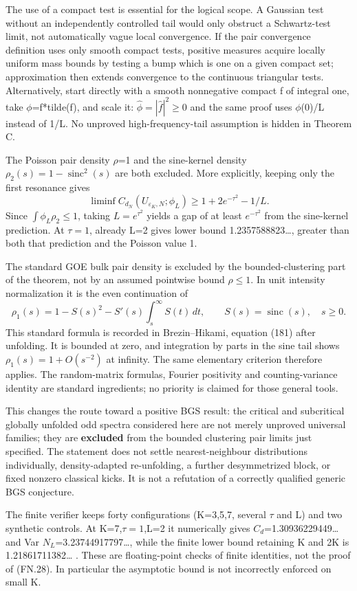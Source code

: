The use of a compact test is essential for the logical scope. A Gaussian test without an independently controlled tail would only obstruct a Schwartz-test limit, not automatically vague local convergence. If the pair convergence definition uses only smooth compact tests, positive measures acquire locally uniform mass bounds by testing a bump which is one on a given compact set; approximation then extends convergence to the continuous triangular tests. Alternatively, start directly with a smooth nonnegative compact f of integral one, take \(\phi\)=f*tilde(f), and scale it: \(\widehat\phi=|\widehat f|^2\geq0\) and the same proof uses \(\phi\)(0)/L instead of 1/L. No unproved high-frequency-tail assumption is hidden in Theorem C.

The Poisson pair density \(\rho\)=1 and the sine-kernel density \(\rho_2(s)=1-\operatorname{sinc}^2(s)\) are both excluded. More explicitly, keeping only the first resonance gives \[
 \liminf C_{d_N}(U_{\varepsilon_K,N};\phi_L)
        \geq1+2e^{-\tau^2}-1/L.                               \tag{FN.31}
\] Since \(\int\phi_L\rho_2\leq1\), taking \(L=e^{\tau^2}\) yields a gap of at least \(e^{-\tau^2}\) from the sine-kernel prediction. At \(\tau=1\), already L=2 gives lower bound 1.2357588823\ldots, greater than both that prediction and the Poisson value 1.

The standard GOE bulk pair density is excluded by the bounded-clustering part of the theorem, not by an assumed pointwise bound \(\rho\leq1\). In unit intensity normalization it is the even continuation of \[
 \rho_1(s)=1-S(s)^2-S'(s)\int_s^\infty S(t)\,dt,\qquad
 S(s)=\operatorname{sinc}(s),\quad s\geq0.                       \tag{FN.32}
\] This standard formula is recorded in Brezin--Hikami, equation (181) after unfolding. It is bounded at zero, and integration by parts in the sine tail shows \(\rho_1(s)=1+O(s^{-2})\) at infinity. The same elementary criterion therefore applies. The random-matrix formulas, Fourier positivity and counting-variance identity are standard ingredients; no priority is claimed for those general tools.

This changes the route toward a positive BGS result: the critical and subcritical globally unfolded odd spectra considered here are not merely unproved universal families; they are \textbf{excluded} from the bounded clustering pair limits just specified. The statement does not settle nearest-neighbour distributions individually, density-adapted re-unfolding, a further desymmetrized block, or fixed nonzero classical kicks. It is not a refutation of a correctly qualified generic BGS conjecture.

The finite verifier keeps forty configurations (K=3,5,7, several \(\tau\) and L) and two synthetic controls. At K=7,\(\tau=1\),L=2 it numerically gives \(C_{d}\)=1.30936229449\ldots{} and Var \(N_{L}\)=3.23744917797\ldots, while the finite lower bound retaining K and 2K is 1.21861711382\ldots{} . These are floating-point checks of finite identities, not the proof of (FN.28). In particular the asymptotic bound is not incorrectly enforced on small K.
